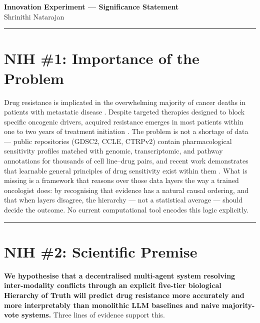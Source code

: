 \documentclass[12pt, letterpaper]{article}
\begin{document}
\begin{center}
    {\LARGE\bfseries Innovation Experiment --- Significance Statement}\\
    \vspace{0.3em}
    {\normalsize Shrinithi Natarajan}
\end{center}

\vspace{0.5em}
\hrule
\vspace{0.8em}

\section{NIH \#1: Importance of the Problem}

Drug resistance is implicated in the overwhelming majority of cancer deaths in patients with
metastatic disease \cite{liu2025multiomics, mao2025ai}. Despite targeted therapies designed to block
specific oncogenic drivers, acquired resistance emerges in most patients within one to two years of
treatment initiation \cite{mao2025ai}. The problem is not a shortage of data --- public repositories
(GDSC2, CCLE, CTRPv2) contain pharmacological sensitivity profiles matched with genomic,
transcriptomic, and pathway annotations for thousands of cell line--drug pairs, and recent work
demonstrates that learnable general principles of drug sensitivity exist within them
\cite{carli2025cellhit}. What is missing is a framework that reasons over those data layers the
way a trained oncologist does: by recognising that evidence has a natural causal ordering, and that
when layers disagree, the hierarchy --- not a statistical average --- should decide the outcome. No
current computational tool encodes this logic explicitly.

\hrule
\vspace{0.5em}

\section{NIH \#2: Scientific Premise}

\textbf{We hypothesise that a decentralised multi-agent system resolving inter-modality conflicts
through an explicit five-tier biological Hierarchy of Truth will predict drug resistance more
accurately and more interpretably than monolithic LLM baselines and naive majority-vote systems.}
Three lines of evidence support this.
\end{document}
